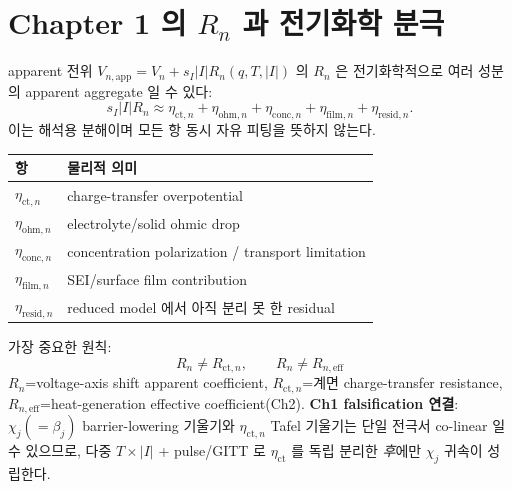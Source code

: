 \documentclass[11pt,a4paper]{article}
\newcommand{\eff}{\mathrm{eff}}
\newcommand{\app}{\mathrm{app}}
\newcommand{\ct}{\mathrm{ct}}
\newcommand{\resid}{\mathrm{resid}}
\begin{document}
\section{Chapter 1 의 $R_n$ 과 전기화학 분극}\label{sec:ch3_Rn}
apparent 전위 $V_{n,\app}=V_n+s_I|I|R_n(q,T,|I|)$ 의 $R_n$ 은 전기화학적으로 여러 성분의 apparent
aggregate 일 수 있다:
\begin{equation}
s_I|I|R_n\approx\eta_{\ct,n}+\eta_{\mathrm{ohm},n}+\eta_{\mathrm{conc},n}+\eta_{\mathrm{film},n}+\eta_{\resid,n}.
\label{eq:ch3_Rn_decomp}
\end{equation}
이는 해석용 분해이며 모든 항 동시 자유 피팅을 뜻하지 않는다.
\begin{longtable}{p{} p{}}
\toprule 항 & 물리적 의미 \\ \midrule \endhead
$\eta_{\ct,n}$ & charge-transfer overpotential \\
$\eta_{\mathrm{ohm},n}$ & electrolyte/solid ohmic drop \\
$\eta_{\mathrm{conc},n}$ & concentration polarization / transport limitation \\
$\eta_{\mathrm{film},n}$ & SEI/surface film contribution \\
$\eta_{\resid,n}$ & reduced model 에서 아직 분리 못 한 residual \\
\bottomrule
\end{longtable}
가장 중요한 원칙:
\begin{equation}
\boxed{\;R_n\ne R_{\ct,n},\qquad R_n\ne R_{n,\eff}\;}
\label{eq:ch3_Rn_not_equal}
\end{equation}
$R_n$=voltage-axis shift apparent coefficient, $R_{\ct,n}$=계면 charge-transfer resistance,
$R_{n,\eff}$=heat-generation effective coefficient(Ch2). \textbf{Ch1 falsification 연결}: $\chi_j(=\beta_j)$
barrier-lowering 기울기와 $\eta_{\ct,n}$ Tafel 기울기는 단일 전극서 co-linear 일 수 있으므로, 다중
$T\times|I|$ + pulse/GITT 로 $\eta_{\ct}$ 를 독립 분리한 \emph{후}에만 $\chi_j$ 귀속이 성립한다.

\end{document}
